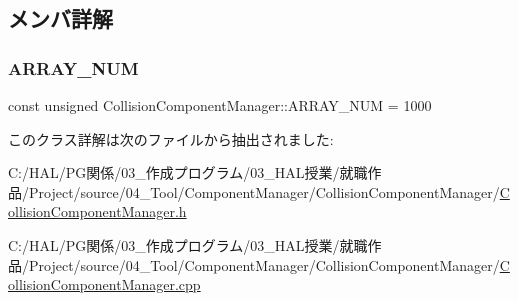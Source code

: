 \subsection{メンバ詳解}
\mbox{\label{class_collision_component_manager_a44b557bb46f56b06522367ca142db710}} 
\subsubsection{\texorpdfstring{A\+R\+R\+A\+Y\+\_\+\+N\+UM}{ARRAY\_NUM}}
{\footnotesize\ttfamily const unsigned Collision\+Component\+Manager\+::\+A\+R\+R\+A\+Y\+\_\+\+N\+UM = 1000\hspace{0.3cm}{\ttfamily [static]}}



このクラス詳解は次のファイルから抽出されました\+:\begin{DoxyCompactItemize}
\item 
C\+:/\+H\+A\+L/\+P\+G関係/03\+\_\+作成プログラム/03\+\_\+\+H\+A\+L授業/就職作品/\+Project/source/04\+\_\+\+Tool/\+Component\+Manager/\+Collision\+Component\+Manager/\mbox{\hyperlink{_collision_component_manager_8h}{Collision\+Component\+Manager.\+h}}\item 
C\+:/\+H\+A\+L/\+P\+G関係/03\+\_\+作成プログラム/03\+\_\+\+H\+A\+L授業/就職作品/\+Project/source/04\+\_\+\+Tool/\+Component\+Manager/\+Collision\+Component\+Manager/\mbox{\hyperlink{_collision_component_manager_8cpp}{Collision\+Component\+Manager.\+cpp}}\end{DoxyCompactItemize}
